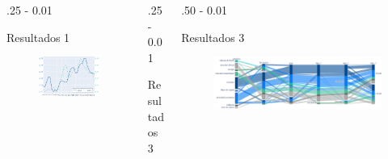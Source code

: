\documentclass{iteraposter}\usepackage[]{graphicx}\usepackage[]{color}
\begin{document}
\begin{frame}
\begin{columns}[onlytextwidth]
  \begin{column}{.25 \textwidth - 0.01 \textwidth}
    \begin{block}{Resultados 1}
      \begin{figure}[H]
        \includegraphics[scale=1]{imagenes/grafica_2.png}
      \end{figure}
      \end{block}
  \end{column}

  \begin{column}{.25 \textwidth - 0.01 \textwidth}
    \begin{block}{Resultados 3}
      
    \end{block}
  \end{column}
  
  \begin{column}{.50 \textwidth - 0.01 \textwidth}
    \begin{block}{Resultados 3}
      \begin{figure}[H]
        \includegraphics[scale=1]{imagenes/grafica_3.png}
      \end{figure}
    \end{block}
  \end{column}
  
\end{columns}

\end{frame}
\end{document}

